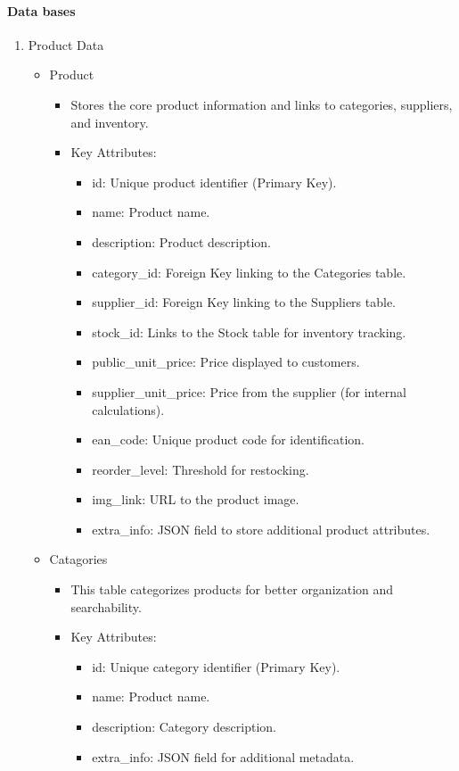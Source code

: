 \documentclass{llncs}
\begin{document}
\paragraph{Data bases}
\begin{enumerate}
    \item Product Data\\
    \begin{itemize}
        \item Product
        \begin{itemize}
            \item Stores the core product information and links to categories, suppliers, and inventory.
            \item Key Attributes:
            \begin{itemize}
                \item id: Unique product identifier (Primary Key).
                \item name: Product name.
                \item description: Product description.
                \item category\_id: Foreign Key linking to the Categories table.
                \item supplier\_id: Foreign Key linking to the Suppliers table.
                \item stock\_id: Links to the Stock table for inventory tracking.
                \item public\_unit\_price: Price displayed to customers.
                \item supplier\_unit\_price: Price from the supplier (for internal calculations).
                \item ean\_code: Unique product code for identification.
                \item reorder\_level: Threshold for restocking.
                \item img\_link: URL to the product image.
                \item extra\_info: JSON field to store additional product attributes. \\
            \end{itemize}
        \end{itemize}
        \item Catagories
        \begin{itemize}
        \item This table categorizes products for better organization and searchability.
        \item Key Attributes:
        \begin{itemize}
            \item id: Unique category identifier (Primary Key).
            \item name: Product name.
            \item description: Category description.
            \item extra\_info: JSON field for additional metadata.\\
        \end{itemize}
    \end{itemize}
    \end{itemize} 



\end{enumerate}
\end{document}
